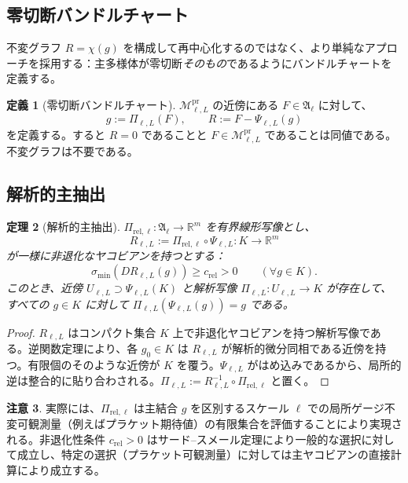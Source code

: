 \documentclass[12pt]{article}
\theoremstyle{plain}
\newtheorem{theorem}{定理}[section]
\theoremstyle{definition}
\newtheorem{definition}[theorem]{定義}
\newtheorem{remark}[theorem]{注意}
\numberwithin{equation}{section}
\newcommand{\R}{\mathbb{R}}
\newcommand{\fA}{\mathfrak{A}}
\newcommand{\pr}{\mathrm{pr}}
\begin{document}
\subsection{零切断バンドルチャート}

不変グラフ $R=\chi(g)$ を構成して再中心化するのではなく、より単純なアプローチを採用する：主多様体が零切断\emph{そのもの}であるようにバンドルチャートを定義する。

\begin{definition}[零切断バンドルチャート]
$\mathcal{M}^{\pr}_{\ell,L}$ の近傍にある $F\in\fA_\ell$ に対して、
\begin{equation}
g := \Pi_{\ell,L}(F),\qquad R := F-\Psi_{\ell,L}(g)
\end{equation}
を定義する。すると $R=0$ であることと $F\in\mathcal{M}^{\pr}_{\ell,L}$ であることは同値である。不変グラフは不要である。
\end{definition}

\subsection{解析的主抽出}

\begin{theorem}[解析的主抽出]\label{thm:extraction}
$\Pi_{\mathrm{rel},\ell}:\fA_\ell\to\R^m$ を有界線形写像とし、
\begin{equation}
R_{\ell,L}:=\Pi_{\mathrm{rel},\ell}\circ\Psi_{\ell,L}:K\to\R^m
\end{equation}
が一様に非退化なヤコビアンを持つとする：
\begin{equation}
\sigma_{\min}(DR_{\ell,L}(g))\geq c_{\mathrm{rel}}>0\qquad(\forall g\in K).
\end{equation}
このとき、近傍 $U_{\ell,L}\supset\Psi_{\ell,L}(K)$ と解析写像 $\Pi_{\ell,L}:U_{\ell,L}\to K$ が存在して、すべての $g\in K$ に対して $\Pi_{\ell,L}(\Psi_{\ell,L}(g))=g$ である。
\end{theorem}

\begin{proof}
$R_{\ell,L}$ はコンパクト集合 $K$ 上で非退化ヤコビアンを持つ解析写像である。逆関数定理により、各 $g_0\in K$ は $R_{\ell,L}$ が解析的微分同相である近傍を持つ。有限個のそのような近傍が $K$ を覆う。$\Psi_{\ell,L}$ がはめ込みであるから、局所的逆は整合的に貼り合わされる。$\Pi_{\ell,L}:=R_{\ell,L}^{-1}\circ\Pi_{\mathrm{rel},\ell}$ と置く。
\end{proof}

\begin{remark}
実際には、$\Pi_{\mathrm{rel},\ell}$ は主結合 $g$ を区別するスケール $\ell$ での局所ゲージ不変可観測量（例えばプラケット期待値）の有限集合を評価することにより実現される。非退化性条件 $c_{\mathrm{rel}}>0$ はサード--スメール定理により一般的な選択に対して成立し、特定の選択（プラケット可観測量）に対しては主ヤコビアンの直接計算により成立する。
\end{remark}
\end{document}
